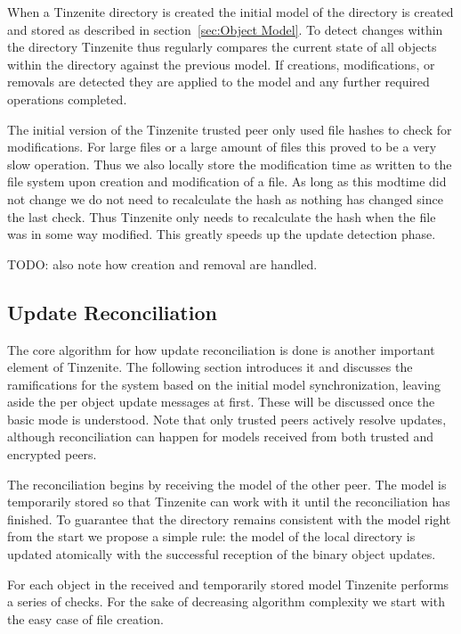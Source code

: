 When a Tinzenite directory is created the initial model of the directory is created and stored as described in section~\ref{sec:Object Model}.
To detect changes within the directory Tinzenite thus regularly compares the current state of all objects within the directory against the previous model.
If creations, modifications, or removals are detected they are applied to the model and any further required operations completed.

The initial version of the Tinzenite trusted peer only used file hashes to check for modifications.
For large files or a large amount of files this proved to be a very slow operation.
Thus we also locally store the modification time as written to the file system upon creation and modification of a file.
As long as this modtime did not change we do not need to recalculate the hash as nothing has changed since the last check.
Thus Tinzenite only needs to recalculate the hash when the file was in some way modified.
This greatly speeds up the update detection phase.

TODO: also note how creation and removal are handled.

\subsection{Update Reconciliation}
\label{sub:Update Reconciliation}

The core algorithm for how update reconciliation is done is another important element of Tinzenite.
The following section introduces it and discusses the ramifications for the system based on the initial model synchronization, leaving aside the per object update messages at first.
These will be discussed once the basic mode is understood.
Note that only trusted peers actively resolve updates, although reconciliation can happen for models received from both trusted and encrypted peers.

The reconciliation begins by receiving the model of the other peer.
The model is temporarily stored so that Tinzenite can work with it until the reconciliation has finished.
To guarantee that the directory remains consistent with the model right from the start we propose a simple rule: the model of the local directory is updated atomically with the successful reception of the binary object updates.

For each object in the received and temporarily stored model Tinzenite performs a series of checks.
For the sake of decreasing algorithm complexity we start with the easy case of file creation.

